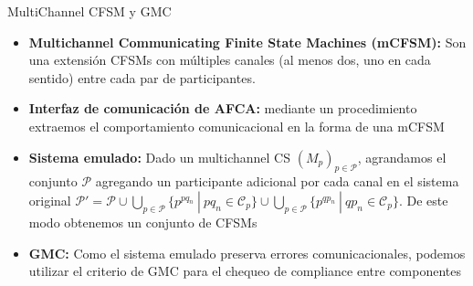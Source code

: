 \documentclass[10pt,xcolor={table,dvipsnames},t]{beamer}
\begin{document}
\begin{frame}{MultiChannel CFSM y GMC}
\begin{itemize}
    \item \textbf{Multichannel Communicating Finite State Machines (mCFSM):} Son una extensión CFSMs con múltiples canales (al menos dos, uno en cada sentido) entre cada par de participantes.
    
    \item \textbf{Interfaz de comunicación de AFCA:} mediante un procedimiento extraemos el comportamiento comunicacional en la forma de una mCFSM
    
    \item \textbf{Sistema emulado:} Dado un multichannel CS $(M_p)_{p \in \mathcal{P}}$, agrandamos el conjunto $ \mathcal{P}$ agregando un participante adicional por cada canal en el sistema original $\mathcal{P}'=\mathcal{P} \cup \bigcup_{p \in \mathcal{P}} \{p^{pq_n} \ | \ pq_n \in \mathcal{C}_p \} \cup \bigcup_{p \in \mathcal{P}} \{p^{qp_n} \ | \ qp_n \in \mathcal{C}_p \}$. De este modo obtenemos un conjunto de CFSMs
    
    \item \textbf{GMC:} Como el sistema emulado preserva errores comunicacionales, podemos utilizar el criterio de GMC para el chequeo de compliance entre componentes
\end{itemize}

\end{frame}
\end{document}
